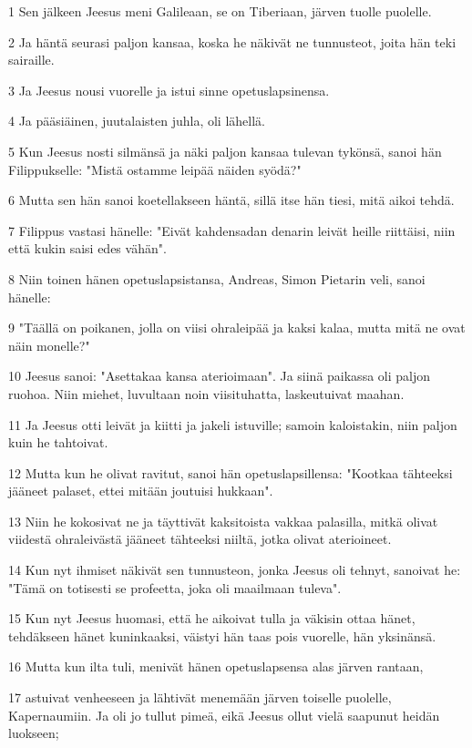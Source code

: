 \par 1 Sen jälkeen Jeesus meni Galileaan, se on Tiberiaan, järven tuolle puolelle.
\par 2 Ja häntä seurasi paljon kansaa, koska he näkivät ne tunnusteot, joita hän teki sairaille.
\par 3 Ja Jeesus nousi vuorelle ja istui sinne opetuslapsinensa.
\par 4 Ja pääsiäinen, juutalaisten juhla, oli lähellä.
\par 5 Kun Jeesus nosti silmänsä ja näki paljon kansaa tulevan tykönsä, sanoi hän Filippukselle: "Mistä ostamme leipää näiden syödä?"
\par 6 Mutta sen hän sanoi koetellakseen häntä, sillä itse hän tiesi, mitä aikoi tehdä.
\par 7 Filippus vastasi hänelle: "Eivät kahdensadan denarin leivät heille riittäisi, niin että kukin saisi edes vähän".
\par 8 Niin toinen hänen opetuslapsistansa, Andreas, Simon Pietarin veli, sanoi hänelle:
\par 9 "Täällä on poikanen, jolla on viisi ohraleipää ja kaksi kalaa, mutta mitä ne ovat näin monelle?"
\par 10 Jeesus sanoi: "Asettakaa kansa aterioimaan". Ja siinä paikassa oli paljon ruohoa. Niin miehet, luvultaan noin viisituhatta, laskeutuivat maahan.
\par 11 Ja Jeesus otti leivät ja kiitti ja jakeli istuville; samoin kaloistakin, niin paljon kuin he tahtoivat.
\par 12 Mutta kun he olivat ravitut, sanoi hän opetuslapsillensa: "Kootkaa tähteeksi jääneet palaset, ettei mitään joutuisi hukkaan".
\par 13 Niin he kokosivat ne ja täyttivät kaksitoista vakkaa palasilla, mitkä olivat viidestä ohraleivästä jääneet tähteeksi niiltä, jotka olivat aterioineet.
\par 14 Kun nyt ihmiset näkivät sen tunnusteon, jonka Jeesus oli tehnyt, sanoivat he: "Tämä on totisesti se profeetta, joka oli maailmaan tuleva".
\par 15 Kun nyt Jeesus huomasi, että he aikoivat tulla ja väkisin ottaa hänet, tehdäkseen hänet kuninkaaksi, väistyi hän taas pois vuorelle, hän yksinänsä.
\par 16 Mutta kun ilta tuli, menivät hänen opetuslapsensa alas järven rantaan,
\par 17 astuivat venheeseen ja lähtivät menemään järven toiselle puolelle, Kapernaumiin. Ja oli jo tullut pimeä, eikä Jeesus ollut vielä saapunut heidän luokseen;
